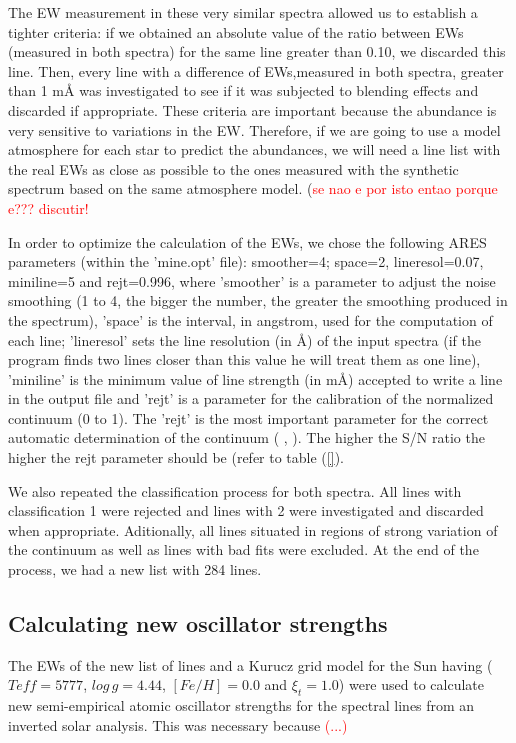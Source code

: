 \documentclass[dvips,12pt,a4paper]{report}
\begin{document}
{The EW measurement in these very similar spectra allowed us to establish a tighter criteria: if we obtained an absolute value of the ratio between EWs (measured in both spectra) for the same line greater than 0.10, we  discarded this line. Then, every line with a difference of EWs,measured in both spectra, greater than 1 m\AA{} was investigated to see if it was subjected to blending effects and discarded if appropriate. These criteria are important because the abundance is very sensitive to variations in the EW. Therefore, if we are going to use a model atmosphere for each star to predict the abundances, we will need a line list with the real EWs as close as possible to the ones measured with the synthetic spectrum based on the same atmosphere model. (\textcolor{red}{se nao e por isto entao porque e??? discutir!}

In order to optimize the calculation of the EWs, we chose the following ARES parameters (within the 'mine.opt' file): smoother=4; space=2, lineresol=0.07, miniline=5 and rejt=0.996, where 'smoother' is a parameter to adjust the noise smoothing (1 to 4, the bigger the number, the greater the smoothing produced in the spectrum), 'space' is the interval, in angstrom, used for the computation of each line; 'lineresol' sets the line resolution (in \AA) of the input spectra (if the program finds two lines closer than this value he will treat them as one line),  'miniline' is the minimum value of line strength (in m\AA{}) accepted to write a line in the output file and 'rejt' is a parameter for the calibration of the normalized continuum (0 to 1). The 'rejt' is the most important parameter for the correct automatic determination of the continuum (\citeauthor{Sousa-2006} \citeyear{Sousa-2006}, \citeyear{Sousa-2007}). The higher the S/N ratio the higher the rejt parameter should be (refer to table (\ref{}).

We also repeated the classification process for both spectra. All lines with classification 1 were rejected and lines with 2 were investigated and discarded when appropriate. Aditionally, all lines situated in regions of strong variation of the continuum as well as lines with bad fits were excluded. At the end of the process, we had a new list with 284 lines. 

\subsection {Calculating new oscillator strengths}
\label{newloggf}
The EWs of the new list of lines and a Kurucz grid model for the Sun \citep{Kurucz-1993} having ($Teff=5777$, $log\, g=4.44$, $[Fe/H]=0.0$ and $\xi_t=1.0$) were used to calculate new semi-empirical atomic oscillator strengths for the spectral lines from an inverted solar analysis. This was necessary because \textcolor{red}{(...)}

}
\end{document}

